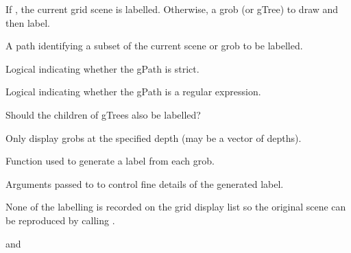 \begin{Arguments}
\begin{ldescription}
\item[\code{x}] 
If , the current grid scene is labelled.
Otherwise, a grob (or gTree) to draw and then label.

\item[\code{gPath}] 
A path identifying a subset of the current scene or grob
to be labelled.

\item[\code{strict}] 
Logical indicating whether the gPath is strict.

\item[\code{grep}] 
Logical indicating whether the gPath is a regular expression.

\item[\code{recurse}] 
Should the children of gTrees also be labelled?

\item[\code{depth}] 
Only display grobs at the specified depth (may be a vector
of depths).

\item[\code{labelfun}] 
Function used to generate a label from each grob.

\item[\code{...}] 
Arguments passed to  to control fine details
of the generated label.

\end{ldescription}
\end{Arguments}
%
\begin{Details}\relax
None of the labelling is recorded on the grid display list so the
original scene can be reproduced by calling .
\end{Details}
%
\begin{SeeAlso}\relax
{} and
\end{SeeAlso}
%

